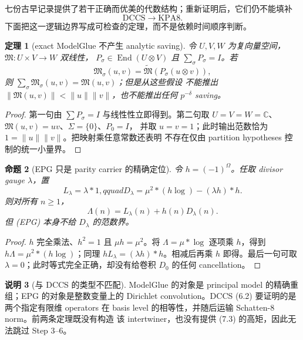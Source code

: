 \documentclass[11pt,a4paper]{ctexart}
\newtheorem{theorem}{定理}[section]
\newtheorem{proposition}[theorem]{命题}
\theoremstyle{definition}
\newtheorem{remark}[theorem]{说明}
\newcommand{\1}{\mathbf 1}
\begin{document}
七份古早记录提供了若干正确而优美的代数结构；重新证明后，它们仍不能填补
\[
\mathrm{DCCS}\longrightarrow\mathrm{KPA8}.
\]
下面把这一逻辑边界写成可检查的定理，而不是依赖时间顺序判断。

\begin{theorem}[exact ModelGlue 不产生 analytic saving]
令 $U,V,W$ 为复向量空间，$\mathfrak M:U\times V\to W$ 双线性，
$P_\sigma\in\operatorname{End}(U\otimes V)$ 且
$\sum_\sigma P_\sigma=I$。若
\[
\mathfrak M_\sigma(u,v)
=\widetilde{\mathfrak M}(P_\sigma(u\otimes v)),
\]
则 $\sum_\sigma\mathfrak M_\sigma(u,v)=\mathfrak M(u,v)$；但是从这些假设
不能推出 $\|\mathfrak M(u,v)\|<\|u\|\|v\|$，也不能推出任何 $p^{-\delta}$ saving。
\end{theorem}

\begin{proof}
第一句由 $\sum P_\sigma=I$ 与线性性立即得到。第二句取
$U=V=W=\mathbb C$、$\mathfrak M(u,v)=uv$、$\Sigma=\{0\}$、$P_0=I$，
并取 $u=v=1$；此时输出范数恰为 $1=\|u\|\|v\|$。把映射乘任意常数还表明
不存在仅由 partition hypotheses 控制的统一小量界。
\end{proof}

\begin{proposition}[EPG 只是 parity carrier 的精确定位]
令 $h=(-1)^\Omega$。任取 divisor gauge $\lambda$，置
\[
L_\lambda=\lambda*1,qquad
D_\lambda=\mu^2*(h\log)-(\lambda h)*h.
\]
则对所有 $n\ge1$，
\[
\Lambda(n)=L_\lambda(n)+h(n)D_\lambda(n).             \tag{EPG}
\]
但 (EPG) 本身不给 $D_\lambda$ 的范数界。
\end{proposition}

\begin{proof}
$h$ 完全乘法、$h^2=1$ 且 $\mu h=\mu^2$。将
$\Lambda=\mu*\log$ 逐项乘 $h$，得到
$h\Lambda=\mu^2*(h\log)$；同理
$hL_\lambda=(\lambda h)*h$。相减后再乘 $h$ 即得。最后一句可取
$\lambda=0$；此时等式完全正确，却没有给卷积 $D_0$ 的任何 cancellation。
\end{proof}

\begin{remark}[与 DCCS 的类型不匹配]
ModelGlue 的对象是 principal model 的精确重组；EPG 的对象是整数变量上的
Dirichlet convolution。DCCS (6.2) 要证明的是两个指定有限维 operators 在
basis level 的相等性，并随后运输 Schatten-$8$ norm。前两条定理既没有构造
该 intertwiner，也没有提供 (7.3) 的高矩，因此无法跳过 Step 3--6。
\end{remark}
\end{document}
